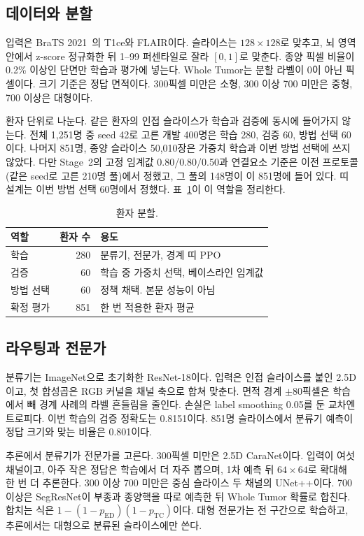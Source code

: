 \documentclass[runningheads]{llncs}
\begin{document}
\subsection{데이터와 분할}
입력은 BraTS 2021~\cite{baid2021}의 T1ce와 FLAIR이다. 슬라이스는 $128\times128$로 맞추고, 뇌 영역 안에서 z-score 정규화한 뒤 1--99 퍼센타일로 잘라 $[0,1]$로 맞춘다. 종양 픽셀 비율이 0.2\% 이상인 단면만 학습과 평가에 넣는다. Whole Tumor는 분할 라벨이 0이 아닌 픽셀이다. 크기 기준은 정답 면적이다. 300픽셀 미만은 소형, 300 이상 700 미만은 중형, 700 이상은 대형이다.

환자 단위로 나눈다. 같은 환자의 인접 슬라이스가 학습과 검증에 동시에 들어가지 않는다. 전체 1{,}251명 중 seed 42로 고른 개발 400명은 학습 280, 검증 60, 방법 선택 60이다. 나머지 851명, 종양 슬라이스 50{,}010장은 가중치 학습과 이번 방법 선택에 쓰지 않았다. 다만 Stage~2의 고정 임계값 0.80/0.80/0.50과 연결요소 기준은 이전 프로토콜(같은 seed로 고른 210명 풀)에서 정했고, 그 풀의 148명이 이 851명에 들어 있다. 띠 설계는 이번 방법 선택 60명에서 정했다. 표~\ref{tab:split}이 이 역할을 정리한다.

\begin{table}[t]
\caption{환자 분할.}
\label{tab:split}
\centering
\begin{tabular}{lrl}
\toprule
역할 & 환자 수 & 용도 \\
\midrule
학습 & 280 & 분류기, 전문가, 경계 띠 PPO \\
검증 & 60 & 학습 중 가중치 선택, 베이스라인 임계값 \\
방법 선택 & 60 & 정책 채택. 본문 성능이 아님 \\
확정 평가 & 851 & 한 번 적용한 환자 평균 \\
\bottomrule
\end{tabular}
\end{table}

\subsection{라우팅과 전문가}
분류기는 ImageNet으로 초기화한 ResNet-18이다. 입력은 인접 슬라이스를 붙인 2.5D이고, 첫 합성곱은 RGB 커널을 채널 축으로 합쳐 맞춘다. 면적 경계 $\pm80$픽셀은 학습에서 빼 경계 사례의 라벨 흔들림을 줄인다. 손실은 label smoothing 0.05를 둔 교차엔트로피다. 이번 학습의 검증 정확도는 0.8151이다. 851명 슬라이스에서 분류기 예측이 정답 크기와 맞는 비율은 0.801이다.

추론에서 분류기가 전문가를 고른다. 300픽셀 미만은 2.5D CaraNet이다. 입력이 여섯 채널이고, 아주 작은 정답은 학습에서 더 자주 뽑으며, 1차 예측 뒤 $64\times64$로 확대해 한 번 더 추론한다. 300 이상 700 미만은 중심 슬라이스 두 채널의 UNet++이다. 700 이상은 SegResNet이 부종과 종양핵을 따로 예측한 뒤 Whole Tumor 확률로 합친다. 합치는 식은 $1-(1-p_{\mathrm{ED}})(1-p_{\mathrm{TC}})$이다. 대형 전문가는 전 구간으로 학습하고, 추론에서는 대형으로 분류된 슬라이스에만 쓴다.
\end{document}
